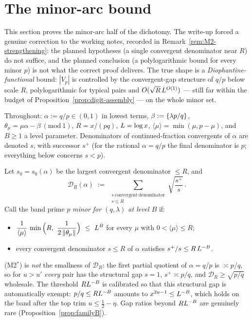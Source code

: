 \section{The minor-arc bound}\label{sec:minor}

This section proves the minor-arc half of the dichotomy. The write-up
forced a genuine correction to the working notes, recorded in
Remark~\ref{rem:M2-strengthening}: the planned hypotheses (a single
convergent denominator near $R$) do not suffice, and the planned
conclusion (a polylogarithmic bound for every minor $p$) is not what the
correct proof delivers. The true shape is a \emph{Diophantine-functional}
bound: $|V_p|$ is controlled by the convergent-gap structure of $q/p$
below scale $R$, polylogarithmic for typical pairs and
$O(\sqrt R\,L^{O(1)})$ --- still far within the budget of
Proposition~\ref{prop:digit-assembly} --- on the whole minor set.

Throughout: $\alpha:=q/p\in(0,1)$ in lowest terms,
$\beta:=\left\{\lambda p/q\right\}$, $\theta_\mu=\mu\alpha-\beta\ (\mathrm{mod}\ 1)$,
$R=x/(pq)$, $L=\log x$, $\langle\mu\rangle=\min(\mu,p-\mu)$, and
$B\ge1$ a level parameter. Denominators of continued-fraction convergents
of $\alpha$ are denoted $s$, with successor $s^{+}$ (for the rational
$\alpha=q/p$ the final denominator is $p$; everything below concerns
$s<p$).

\begin{definition}\label{def:minor-conditions}
Let $s_0=s_0(\alpha)$ be the largest convergent denominator $\le R$, and
\[
\mathcal D_R(\alpha)\;:=\;
\sum_{\substack{s\ \mathrm{convergent\ denominator}\\ s\le R}}
\sqrt{\frac{s^{+}}{s}}\,.
\]
Call the band prime $p$ \emph{minor for $(q,\lambda)$ at level $B$} if:
\begin{itemize}
\item[(M1)] $\displaystyle
\frac{1}{\langle\mu\rangle}\,
\min\Big(R,\ \frac{1}{2\left\| \theta_\mu\right\|}\Big)\ \le\ L^{B}$
\quad for every $\mu$ with $0<\langle\mu\rangle\le R$;
\item[(M2$^*$)] every convergent denominator $s\le R$ of $\alpha$
satisfies $s^{+}/s\le R\,L^{-B}$.
\end{itemize}
\end{definition}

\begin{remark}
(M2$^*$) is \emph{not} the smallness of $\mathcal D_R$: the first
partial quotient of $\alpha=q/p$ is $\asymp p/q$, so for $u>u'$
\emph{every} pair has the structural gap $s=1$, $s^{+}\asymp p/q$, and
$\mathcal D_R\ge\sqrt{p/q}$ wholesale. The threshold $RL^{-B}$ is
calibrated so that this structural gap is automatically exempt:
$p/q\le RL^{-B}$ amounts to $x^{2u-1}\le L^{-B}$, which holds on
the band after the top trim $u\le\tfrac12-\eta$. Gap ratios beyond
$RL^{-B}$ are genuinely rare (Proposition~\ref{prop:familyB}).
\end{remark}

